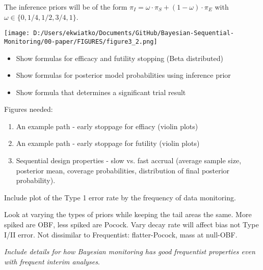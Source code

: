 \documentclass[12pt]{article}
\begin{document}
The inference priors will be of the form $\pi_{I}=\omega\cdot\pi_{S}+(1-\omega)\cdot\pi_E$ with $\omega\in\{0,1/4,1/2,3/4,1\}$.
\begin{center}
\texttt{[image: D:/Users/ekwiatko/Documents/GitHub/Bayesian-Sequential-Monitoring/00-paper/FIGURES/figure3\_2.png]}
\end{center}

\begin{itemize}
\item Show formulas for efficacy and futility stopping (Beta distributed)
\item Show formulas for posterior model probabilities using inference prior
\item Show formula that determines a significant trial result
\end{itemize}

Figures needed:
\begin{enumerate}
\item An example path - early stoppage for effiacy (violin plots)
\item An example path - early stoppage for futility (violin plots)
\item Sequential design properties - slow vs. fast accrual (average sample size, posterior mean, coverage probabilities, distribution of final posterior probability).
\end{enumerate}

Include plot of the Type 1 error rate by the frequency of data monitoring.

Look at varying the types of priors while keeping the tail areas the same. More spiked are OBF, less spiked are Pocock.
Vary decay rate will affect bias not Type I/II error. Not dissimilar to Frequentist: flatter-Pocock, mass at null-OBF.

\textit{Include details for how Bayesian monitoring has good frequentist properties even with frequent interim analyses}.





\end{document}
